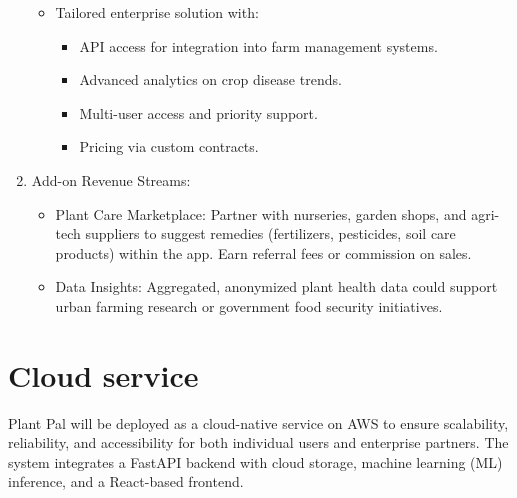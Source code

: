 \documentclass[11pt]{article}
\begin{document}
\begin{enumerate}
\begin{itemize}
        \item Tailored enterprise solution with:
        \begin{itemize}
            \item API access for integration into farm management systems.
            \item Advanced analytics on crop disease trends.
            \item Multi-user access and priority support.
            \item Pricing via custom contracts.
        \end{itemize}
    \end{itemize}
    \item Add-on Revenue Streams:
    \begin{itemize}
        \item Plant Care Marketplace: Partner with nurseries, garden shops, and agri-tech suppliers to suggest remedies (fertilizers, pesticides, soil care products) within the app. Earn referral fees or commission on sales.
        \item Data Insights: Aggregated, anonymized plant health data could support urban farming research or government food security initiatives.
    \end{itemize}
\end{enumerate}

\section{Cloud service}

Plant Pal will be deployed as a cloud-native service on AWS to ensure scalability, reliability, and accessibility for both individual users and enterprise partners. The system integrates a FastAPI backend with cloud storage, machine learning (ML) inference, and a React-based frontend.
\end{document}
